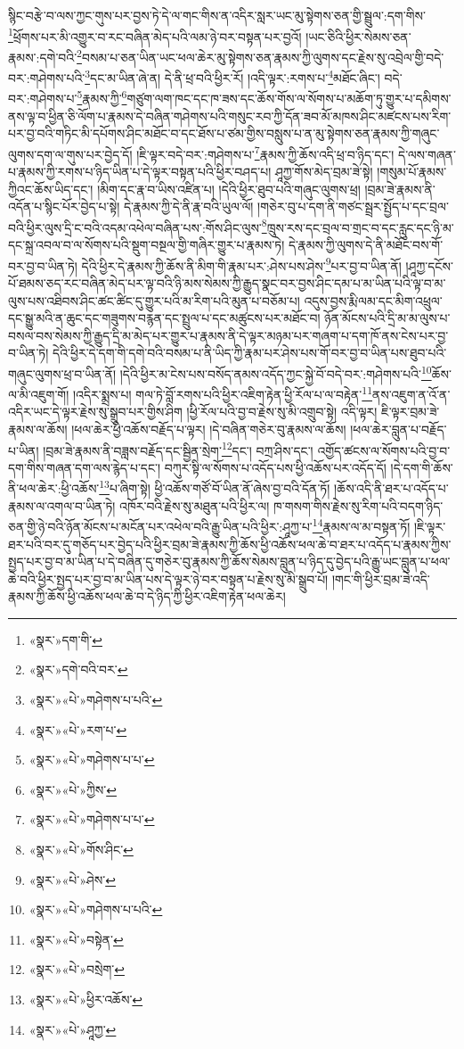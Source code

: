 སྙིང་བརྩེ་བ་ལས་ཀྱང་གུས་པར་བྱས་ཏེ་དེ་ལ་གང་གིས་ན་འདིར་སླར་ཡང་མུ་སྟེགས་ཅན་གྱི་སྦྲུལ་:དག་གིས་\footnote{«སྣར་»དག་གི་}ཕྲོགས་པར་མི་འགྱུར་བ་རང་བཞིན་མེད་པའི་ལམ་ཉེ་བར་བསྟན་པར་བྱའོ། །ཡང་ཅིའི་ཕྱིར་སེམས་ཅན་རྣམས་:དགེ་བའི་\footnote{«སྣར་»དགེ་བའི་བར་}བསམ་པ་ཅན་ཡིན་ཡང་ཕལ་ཆེར་མུ་སྟེགས་ཅན་རྣམས་ཀྱི་ལུགས་དང་རྗེས་སུ་འབྲེལ་གྱི་བདེ་བར་:གཤེགས་པའི་\footnote{«སྣར་»«པེ་»གཤེགས་པ་པའི་}དང་མ་ཡིན་ཞེ་ན། དེ་ནི་ཕྲ་བའི་ཕྱིར་རོ། །འདི་ལྟར་:རགས་པ་\footnote{«སྣར་»«པེ་»རག་པ་}མཐོང་ཞིང་། བདེ་བར་:གཤེགས་པ་\footnote{«སྣར་»«པེ་»གཤེགས་པ་པ་}རྣམས་ཀྱི་\footnote{«སྣར་»«པེ་»ཀྱིས་}གཙུག་ལག་ཁང་དང་ཁ་ཟས་དང་ཆོས་གོས་ལ་སོགས་པ་མཆོག་ཏུ་གྱུར་པ་དམིགས་ནས་ལྟ་བ་ཕྱིན་ཅི་ལོག་པ་རྣམས་དེ་བཞིན་གཤེགས་པའི་གསུང་རབ་ཀྱི་དོན་ཟབ་མོ་མཁས་ཤིང་མཛངས་པས་རིག་པར་བྱ་བའི་གཏིང་མི་དཔོགས་ཤིང་མཐོང་བ་དང་ཐོས་པ་ཙམ་གྱིས་བསླུས་པ་ན་མུ་སྟེགས་ཅན་རྣམས་ཀྱི་གཞུང་ལུགས་དག་ལ་གུས་པར་བྱེད་དོ། །ཇི་ལྟར་བདེ་བར་:གཤེགས་པ་\footnote{«སྣར་»«པེ་»གཤེགས་པ་པ་}རྣམས་ཀྱི་ཆོས་འདི་ཕྲ་བ་ཉིད་དང་། དེ་ལས་གཞན་པ་རྣམས་ཀྱི་རགས་པ་ཉིད་ཡིན་པ་དེ་ལྟར་བསྟན་པའི་ཕྱིར་བཤད་པ། ཤཱཀྱ་གོས་མེད་བྲམ་ཟེ་སྟེ། །གསུམ་པོ་རྣམས་ཀྱིའང་ཆོས་ཡིད་དང་། །མིག་དང་རྣ་བ་ཡིས་འཛིན་པ། །དེའི་ཕྱིར་ཐུབ་པའི་གཞུང་ལུགས་ཕྲ། །བྲམ་ཟེ་རྣམས་ནི་འདོན་པ་སྙིང་པོར་བྱེད་པ་སྟེ། དེ་རྣམས་ཀྱི་དེ་ནི་རྣ་བའི་ཡུལ་ལོ། །གཅེར་བུ་པ་དག་ནི་གཙང་སྦྲར་སྤྱོད་པ་དང་བྲལ་བའི་ཕྱིར་ལུས་དྲི་ང་བའི་འདམ་འཕེལ་བཞིན་པས་:གོས་ཤིང་ལུས་\footnote{«སྣར་»«པེ་»གོས་ཤིང་}ཁྲུས་རས་དང་བྲལ་བ་གྲང་བ་དང་རླུང་དང་ཉི་མ་དང་སྐྲ་འབལ་བ་ལ་སོགས་པའི་སྡུག་བསྔལ་གྱི་གཞིར་གྱུར་པ་རྣམས་ཏེ། དེ་རྣམས་ཀྱི་ལུགས་དེ་ནི་མཐོང་བས་གོ་བར་བྱ་བ་ཡིན་ཏེ། དེའི་ཕྱིར་དེ་རྣམས་ཀྱི་ཆོས་ནི་མིག་གི་རྣམ་པར་:ཤེས་པས་ཤེས་\footnote{«སྣར་»«པེ་»ཤེས་}པར་བྱ་བ་ཡིན་ནོ། །ཤཱཀྱ་དངོས་པོ་ཐམས་ཅད་རང་བཞིན་མེད་པར་ལྟ་བའི་ཉི་མས་སེམས་ཀྱི་རྒྱུད་སྣང་བར་བྱས་ཤིང་དམ་པ་མ་ཡིན་པའི་ལྟ་བ་མ་ལུས་པས་འཐིབས་ཤིང་ཚང་ཚིང་དུ་གྱུར་པའི་མ་རིག་པའི་མུན་པ་བཅོམ་པ། འདུས་བྱས་རྨི་ལམ་དང་མིག་འཕྲུལ་དང་སྒྱུ་མའི་ན་ཆུང་དང་གཟུགས་བརྙན་དང་སྤྲུལ་པ་དང་མཚུངས་པར་མཐོང་བ། ཉོན་མོངས་པའི་དྲི་མ་མ་ལུས་པ་བསལ་བས་སེམས་ཀྱི་རྒྱུད་དྲི་མ་མེད་པར་གྱུར་པ་རྣམས་ནི་དེ་ལྟར་མཉམ་པར་གཞག་པ་དག་ཁོ་ནས་ངེས་པར་བྱ་བ་ཡིན་ཏེ། དེའི་ཕྱིར་དེ་དག་གི་དགེ་བའི་བསམ་པ་ནི་ཡིད་ཀྱི་རྣམ་པར་ཤེས་པས་གོ་བར་བྱ་བ་ཡིན་པས་ཐུབ་པའི་གཞུང་ལུགས་ཕྲ་བ་ཡིན་ནོ། །དེའི་ཕྱིར་མ་ངེས་པས་བསོད་ནམས་འདོད་ཀྱང་སྐྱེ་བོ་བདེ་བར་:གཤེགས་པའི་\footnote{«སྣར་»«པེ་»གཤེགས་པ་པའི་}ཆོས་ལ་མི་འཇུག་གོ། །འདིར་སྨྲས་པ། གལ་ཏེ་བློ་རགས་པའི་ཕྱིར་འཇིག་རྟེན་ཕྱི་རོལ་པ་ལ་བརྟེན་\footnote{«སྣར་»«པེ་»བསྟེན་}ནས་འཇུག་ན་འོ་ན་འདིར་ཡང་དེ་ལྟར་རྗེས་སུ་སྒྲུབ་པར་གྱིས་ཤིག །ཕྱི་རོལ་པའི་བྱ་བ་རྗེས་སུ་མི་འགྲུབ་སྟེ། འདི་ལྟར། ཇི་ལྟར་བྲམ་ཟེ་རྣམས་ལ་ཆོས། །ཕལ་ཆེར་ཕྱི་འཆོས་བརྗོད་པ་ལྟར། །དེ་བཞིན་གཅེར་བུ་རྣམས་ལ་ཆོས། །ཕལ་ཆེར་བླུན་པ་བརྗོད་པ་ཡིན། །བྲམ་ཟེ་རྣམས་ནི་བཟླས་བརྗོད་དང་སྦྱིན་སྲེག་\footnote{«སྣར་»«པེ་»བསྲེག་}དང་། བཀྲ་ཤིས་དང་། འགྱོད་ཚངས་ལ་སོགས་པའི་བྱ་བ་དག་གིས་གཞན་དག་ལས་རྙེད་པ་དང་། བཀུར་སྟི་ལ་སོགས་པ་འདོད་པས་ཕྱི་འཆོས་པར་འདོད་དོ། །དེ་དག་གི་ཆོས་ནི་ཕལ་ཆེར་:ཕྱི་འཆོས་\footnote{«སྣར་»«པེ་»ཕྱིར་འཆོས་}པ་ཞིག་སྟེ། ཕྱི་འཆོས་གཙོ་བོ་ཡིན་ནོ་ཞེས་བྱ་བའི་དོན་ཏོ། །ཆོས་འདི་ནི་ཐར་པ་འདོད་པ་རྣམས་ལ་འགལ་བ་ཡིན་ཏེ། འཁོར་བའི་རྗེས་སུ་མཐུན་པའི་ཕྱིར་ལ། ཁ་གསག་གིས་རྗེས་སུ་རིག་པའི་བདག་ཉིད་ཅན་གྱི་ཉེ་བའི་ཉོན་མོངས་པ་མངོན་པར་འཕེལ་བའི་རྒྱུ་ཡིན་པའི་ཕྱིར་:ཤཱཀྱ་པ་\footnote{«སྣར་»«པེ་»ཤཱཀྱ་}རྣམས་ལ་མ་བསྟན་ཏོ། །ཇི་ལྟར་ཐར་པའི་བར་དུ་གཅོད་པར་བྱེད་པའི་ཕྱིར་བྲམ་ཟེ་རྣམས་ཀྱི་ཆོས་ཕྱི་འཆོས་ཕལ་ཆེ་བ་ཐར་པ་འདོད་པ་རྣམས་ཀྱིས་སྤྱད་པར་བྱ་བ་མ་ཡིན་པ་དེ་བཞིན་དུ་གཅེར་བུ་རྣམས་ཀྱི་ཆོས་སེམས་བླུན་པ་ཉིད་དུ་བྱེད་པའི་རྒྱུ་ཡང་བླུན་པ་ཕལ་ཆེ་བའི་ཕྱིར་སྤྱད་པར་བྱ་བ་མ་ཡིན་པས་དེ་ལྟར་ཉེ་བར་བསྟན་པ་རྗེས་སུ་མི་སྒྲུབ་པོ། །གང་གི་ཕྱིར་བྲམ་ཟེ་འདི་རྣམས་ཀྱི་ཆོས་ཕྱི་འཆོས་ཕལ་ཆེ་བ་དེ་ཉིད་ཀྱི་ཕྱིར་འཇིག་རྟེན་ཕལ་ཆེར། 
